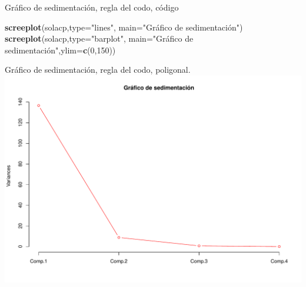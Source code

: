 \documentclass[
  ignorenonframetext,
]{beamer}
\newenvironment{Shaded}{\begin{snugshade}}{\end{snugshade}}
\newcommand{\AttributeTok}[1]{\textcolor[rgb]{0.13,0.29,0.53}{#1}}
\newcommand{\DecValTok}[1]{\textcolor[rgb]{0.00,0.00,0.81}{#1}}
\newcommand{\FunctionTok}[1]{\textcolor[rgb]{0.13,0.29,0.53}{\textbf{#1}}}
\newcommand{\NormalTok}[1]{#1}
\newcommand{\StringTok}[1]{\textcolor[rgb]{0.31,0.60,0.02}{#1}}
\begin{document}
\begin{frame}[fragile]{Gráfico de sedimentación, regla del codo, código}
\label{gruxe1fico-de-sedimentaciuxf3n-regla-del-codo-cuxf3digo}
\begin{Shaded}
\begin{Highlighting}[]
\FunctionTok{screeplot}\NormalTok{(solacp,}\AttributeTok{type=}\StringTok{"lines"}\NormalTok{,}
          \AttributeTok{main=}\StringTok{"Gráfico de sedimentación"}\NormalTok{)}
\FunctionTok{screeplot}\NormalTok{(solacp,}\AttributeTok{type=}\StringTok{"barplot"}\NormalTok{,}
          \AttributeTok{main=}\StringTok{"Gráfico de sedimentación"}\NormalTok{,}\AttributeTok{ylim=}\FunctionTok{c}\NormalTok{(}\DecValTok{0}\NormalTok{,}\DecValTok{150}\NormalTok{))}
\end{Highlighting}
\end{Shaded}
\end{frame}

\begin{frame}{Gráfico de sedimentación, regla del codo, poligonal.}
\label{gruxe1fico-de-sedimentaciuxf3n-regla-del-codo-poligonal.}
\includegraphics{AnalisisComponentesPrincipales_fusion_files/figure-beamer/screeplotlines-1.pdf}
\end{frame}
\end{document}
